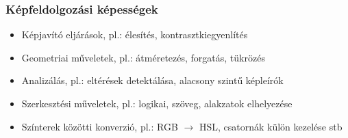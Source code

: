 \documentclass[a4paper,12pt,oneside]{report}
\begin{document}
\subsubsection{Képfeldolgozási képességek}
\begin{itemize}
	\itemsep0em
	\item Képjavító eljárások, pl.: élesítés, kontrasztkiegyenlítés
	\item Geometriai műveletek, pl.: átméretezés, forgatás, tükrözés
	\item Analizálás, pl.: eltérések detektálása, alacsony szintű képleírók
	\item Szerkesztési műveletek, pl.: logikai, szöveg, alakzatok elhelyezése
	\item Színterek közötti konverzió, pl.: RGB $\rightarrow $ HSL, csatornák külön kezelése stb

\end{itemize}
\end{document}
